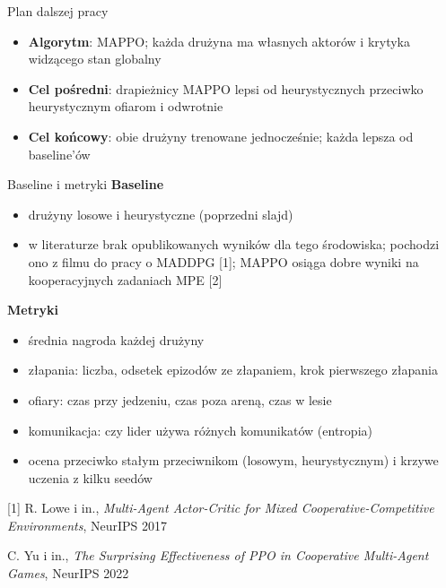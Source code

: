 \documentclass[aspectratio=169,10pt]{beamer}
\begin{document}
\begin{frame}{Plan dalszej pracy}
  \begin{itemize}
    \setlength{\itemsep}{12pt}
    \item \textbf{Algorytm}: MAPPO; każda drużyna ma własnych aktorów
      i krytyka widzącego stan globalny
    \item \textbf{Cel pośredni}: drapieżnicy MAPPO lepsi od heurystycznych przeciwko heurystycznym ofiarom
      i odwrotnie
    \item \textbf{Cel końcowy}: obie drużyny trenowane jednocześnie; każda lepsza od baseline'ów
  \end{itemize}
\end{frame}

\begin{frame}{Baseline i metryki}
  \textbf{Baseline}
  \begin{itemize}\small
    \item drużyny losowe i heurystyczne (poprzedni slajd)
    \item w literaturze brak opublikowanych wyników dla tego środowiska; pochodzi ono z filmu
      do pracy o MADDPG [1]; MAPPO osiąga dobre wyniki na kooperacyjnych zadaniach MPE [2]
  \end{itemize}
  \textbf{Metryki}
  \begin{itemize}\small
    \item średnia nagroda każdej drużyny
    \item złapania: liczba, odsetek epizodów ze złapaniem, krok pierwszego złapania
    \item ofiary: czas przy jedzeniu, czas poza areną, czas w lesie
    \item komunikacja: czy lider używa różnych komunikatów (entropia)
    \item ocena przeciwko stałym przeciwnikom (losowym, heurystycznym) i krzywe uczenia z kilku seedów
  \end{itemize}
  \vfill
  {\tiny
    [1] R. Lowe i in., \emph{Multi-Agent Actor-Critic for Mixed Cooperative-Competitive Environments}, NeurIPS 2017\par
    [2] C. Yu i in., \emph{The Surprising Effectiveness of PPO in Cooperative Multi-Agent Games}, NeurIPS 2022\par}
\end{frame}
\end{document}
